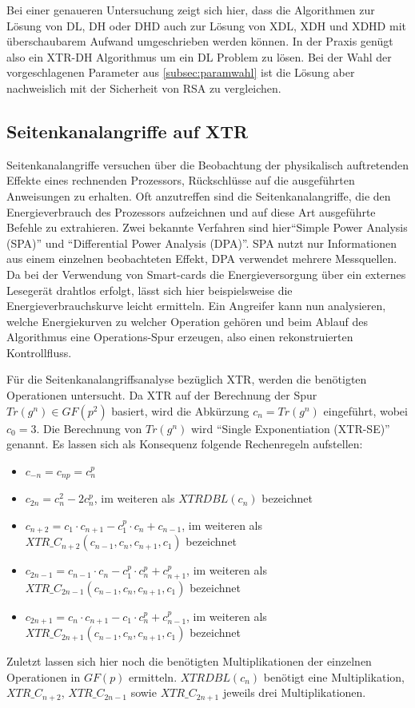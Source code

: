 \documentclass[10pt,        %
               a4paper,     %
               journal,     %
               ]{IEEEtran}
\begin{document}
Bei einer genaueren Untersuchung zeigt sich hier, dass die Algorithmen zur Lösung von DL, DH oder DHD auch zur Lösung von XDL, XDH und XDHD
mit überschaubarem Aufwand umgeschrieben werden können.
In der Praxis genügt also ein XTR-DH Algorithmus um ein DL Problem zu lösen. Bei der Wahl der vorgeschlagenen Parameter aus \ref{subsec:paramwahl}
ist die Lösung aber nachweislich mit der Sicherheit von RSA zu vergleichen.

\subsection{Seitenkanalangriffe auf XTR}
\label{subsec:seitenkanal}
Seitenkanalangriffe versuchen über die Beobachtung der physikalisch auftretenden Effekte eines rechnenden Prozessors, Rückschlüsse auf die ausgeführten Anweisungen zu erhalten. Oft anzutreffen sind die Seitenkanalangriffe, die den Energieverbrauch des Prozessors aufzeichnen und auf diese Art ausgeführte Befehle zu extrahieren. Zwei bekannte Verfahren sind hier"`Simple Power Analysis (SPA)"' und "`Differential Power Analysis (DPA)"'. SPA nutzt nur Informationen aus einem einzelnen beobachteten Effekt, DPA verwendet mehrere Messquellen. Da bei der Verwendung von Smart-cards die Energieversorgung über ein externes Lesegerät drahtlos erfolgt, lässt sich hier beispielsweise die Energieverbrauchskurve leicht ermitteln.
Ein Angreifer kann nun analysieren, welche Energiekurven zu welcher Operation gehören und beim Ablauf des Algorithmus eine Operations-Spur erzeugen, also einen rekonstruierten Kontrollfluss.

Für die Seitenkanalangriffsanalyse bezüglich XTR, werden die benötigten Operationen untersucht. 
Da XTR auf der Berechnung der Spur $Tr(g^n)\in GF(p^2)$ basiert, wird die Abkürzung $c_n = Tr(g^n)$ eingeführt, wobei $c_0=3$. Die Berechnung von $Tr(g^n)$ wird "`Single Exponentiation (XTR-SE)"' genannt.
Es lassen sich als Konsequenz folgende Rechenregeln aufstellen:
\begin{itemize}
	\item $c_{-n}=c_{np}=c_n^p$
	\item $c_{2n}=c_n^2-2c_n^p$, im weiteren als \newline $XTRDBL(c_n)$ bezeichnet
	\item $c_{n+2}=c_1 \cdot c_{n+1} - c_1^p \cdot c_n + c_{n-1}$, im weiteren als\newline  $XTR\_C_{n+2}(c_{n-1},c_n,c_{n+1},c_1)$ bezeichnet
	\item $c_{2n-1}=c_{n-1}\cdot c_n - c_1^p \cdot c_n^p + c_{n+1}^p$, im weiteren als\newline  $XTR\_C_{2n-1}(c_{n-1},c_n,c_{n+1},c_1)$ bezeichnet
	\item $c_{2n+1}=c_n \cdot c_{n+1} - c_1 \cdot c_n^p + c_{n-1}^p$, im weiteren als\newline  $XTR\_C_{2n+1}(c_{n-1},c_n,c_{n+1},c_1)$ bezeichnet
\end{itemize}
Zuletzt lassen sich hier noch die benötigten Multiplikationen der einzelnen Operationen in $GF(p)$ ermitteln. $XTRDBL(c_n)$ benötigt eine Multiplikation,
$XTR\_C_{n+2}$, $XTR\_C_{2n-1}$ sowie $XTR\_C_{2n+1}$ jeweils drei Multiplikationen.\cite{side-channel2}
\end{document}
